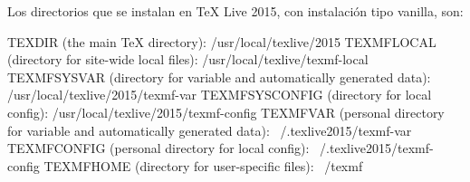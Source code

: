 Los directorios que se instalan en TeX Live 2015, con instalación tipo vanilla, son:

  TEXDIR (the main TeX directory):
  /usr/local/texlive/2015
  TEXMFLOCAL (directory for site-wide local files):
  /usr/local/texlive/texmf-local
  TEXMFSYSVAR (directory for variable and automatically generated data):
  /usr/local/texlive/2015/texmf-var
  TEXMFSYSCONFIG (directory for local config):
  /usr/local/texlive/2015/texmf-config
  TEXMFVAR (personal directory for variable and automatically generated data):
  ~/.texlive2015/texmf-var
  TEXMFCONFIG (personal directory for local config):
  ~/.texlive2015/texmf-config
  TEXMFHOME (directory for user-specific files):
  ~/texmf


